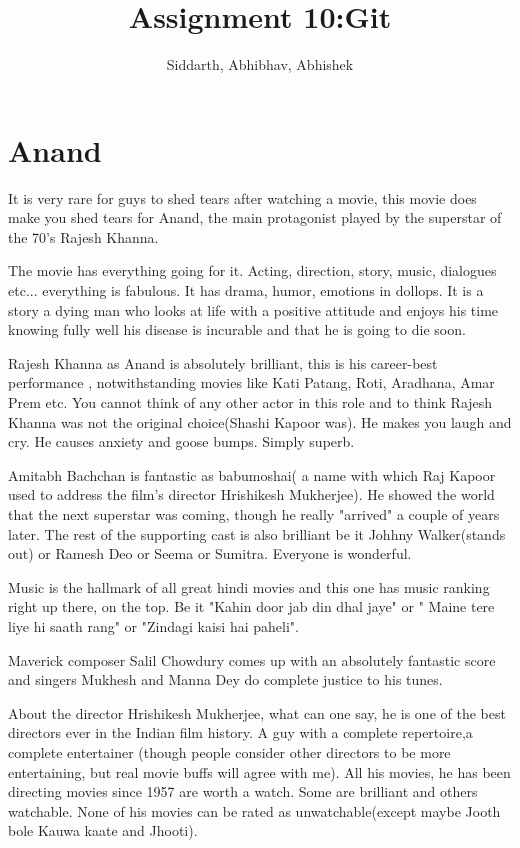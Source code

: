 \documentclass{article}
\title{Assignment 10:Git}
\author{Siddarth, Abhibhav, Abhishek}
\begin{document}
\maketitle
\section{Anand}
It is very rare for guys to shed tears after watching a movie, this movie does make you shed tears for Anand, the main protagonist played by the superstar of the 70's Rajesh Khanna.

The movie has everything going for it. Acting, direction, story, music, dialogues etc... everything is fabulous. It has drama, humor, emotions in dollops. It is a story a dying man who looks at life with a positive attitude and enjoys his time knowing fully well his disease is incurable and that he is going to die soon.

Rajesh Khanna as Anand is absolutely brilliant, this is his career-best performance , notwithstanding movies like Kati Patang, Roti, Aradhana, Amar Prem etc. You cannot think of any other actor in this role and to think Rajesh Khanna was not the original choice(Shashi Kapoor was). He makes you laugh and cry. He causes anxiety and goose bumps. Simply superb.

Amitabh Bachchan is fantastic as babumoshai( a name with which Raj Kapoor used to address the film's director Hrishikesh Mukherjee). He showed the world that the next superstar was coming, though he really "arrived" a couple of years later. The rest of the supporting cast is also brilliant be it Johhny Walker(stands out) or Ramesh Deo or Seema or Sumitra. Everyone is wonderful.

Music is the hallmark of all great hindi movies and this one has music ranking right up there, on the top. Be it "Kahin door jab din dhal jaye" or " Maine tere liye hi saath rang" or "Zindagi kaisi hai paheli".

Maverick composer Salil Chowdury comes up with an absolutely fantastic score and singers Mukhesh and Manna Dey do complete justice to his tunes.

About the director Hrishikesh Mukherjee, what can one say, he is one of the best directors ever in the Indian film history. A guy with a complete repertoire,a complete entertainer (though people consider other directors to be more entertaining, but real movie buffs will agree with me). All his movies, he has been directing movies since 1957 are worth a watch. Some are brilliant and others watchable. None of his movies can be rated as unwatchable(except maybe Jooth bole Kauwa kaate and Jhooti).
\end{document}

